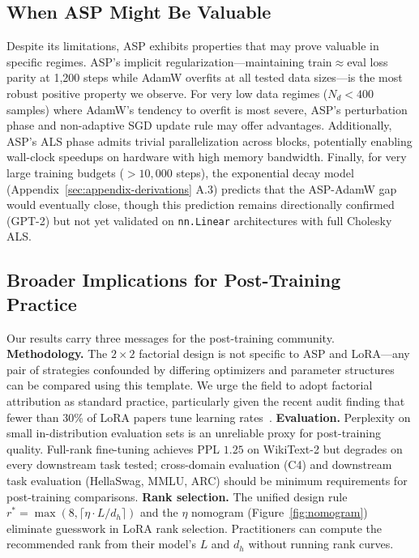 \documentclass[11pt]{article}
\begin{document}
\subsection{When ASP Might Be Valuable}

Despite its limitations, ASP exhibits properties that may prove valuable in specific regimes. ASP's implicit regularization---maintaining train$\approx$eval loss parity at 1,200 steps while AdamW overfits at all tested data sizes---is the most robust positive property we observe. For very low data regimes ($N_d < 400$ samples) where AdamW's tendency to overfit is most severe, ASP's perturbation phase and non-adaptive SGD update rule may offer advantages. Additionally, ASP's ALS phase admits trivial parallelization across blocks, potentially enabling wall-clock speedups on hardware with high memory bandwidth. Finally, for very large training budgets ($>10,000$ steps), the exponential decay model (Appendix~\ref{sec:appendix-derivations} A.3) predicts that the ASP-AdamW gap would eventually close, though this prediction remains directionally confirmed (GPT-2) but not yet validated on \texttt{nn.Linear} architectures with full Cholesky ALS.

\subsection{Broader Implications for Post-Training Practice}

Our results carry three messages for the post-training community. \textbf{Methodology.} The $2\times 2$ factorial design is not specific to ASP and LoRA---any pair of strategies confounded by differing optimizers and parameter structures can be compared using this template. We urge the field to adopt factorial attribution as standard practice, particularly given the recent audit finding that fewer than 30\% of LoRA papers tune learning rates~\cite{lee2026learning}. \textbf{Evaluation.} Perplexity on small in-distribution evaluation sets is an unreliable proxy for post-training quality. Full-rank fine-tuning achieves PPL $1.25$ on WikiText-2 but degrades on every downstream task tested; cross-domain evaluation (C4) and downstream task evaluation (HellaSwag, MMLU, ARC) should be minimum requirements for post-training comparisons. \textbf{Rank selection.} The unified design rule $r^* = \max(8, \lceil\eta \cdot L/d_h\rceil)$ and the $\eta$ nomogram (Figure~\ref{fig:nomogram}) eliminate guesswork in LoRA rank selection. Practitioners can compute the recommended rank from their model's $L$ and $d_h$ without running rank curves.
\end{document}
